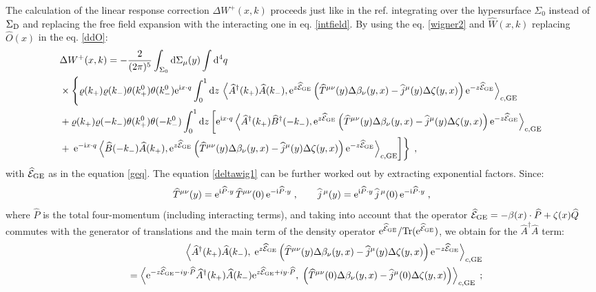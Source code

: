\documentclass[prd,superscriptaddress,nofootinbib,notitlepage]{revtex4-1}
\def\wT{{\widehat T}}
\def\wj{{\widehat j}}
\def\wP{{\widehat P}}
\def\wA{{\widehat A}}
\def\wB{{\widehat B}}
\def\wQ{{\widehat Q}}
\def\wE{{\widehat{\cal E}}}
\def\wA{\widehat A}
\def\wAd{\widehat A^{\dagger}}
\def\wB{\widehat B}
\def\wBd{\widehat B^{\dagger}}
\def\wW{\widehat W}
\def\wO{\widehat O}
\def\wQ{\widehat Q}
\newcommand{\Tr}{{\rm Tr}}
\newcommand{\e}{{\rm e}}
\newcommand{\di}{{\rm d}}
\newcommand{\ii}{{\rm i}}
\begin{document}
The calculation of the linear response correction $\Delta W^+(x,k)$ proceeds just like in the ref. \cite{Sheng:2025cjk} 
integrating over the hypersurface $\Sigma_0$ instead of $\Sigma_{\rm D}$ and replacing the free field expansion with
the interacting one in eq. \eqref{intfield}. By using the eq. \eqref{wigner2} and $\wW(x,k)$ replacing $\wO(x)$ in the
eq. \eqref{ddO}:
%
\begin{align}\label{deltawig1}
 &\Delta W^+(x,k) = - \frac{2}{(2\pi)^5} \int_{\Sigma_{0}} \di \Sigma_{\mu}(y)  
  \int \di^{4}q\;
   \nonumber\\
&\times \Bigg\{\varrho(k_+)\varrho(k_-)\theta(k_+^0)\theta(k_-^0) \e^{\ii x\cdot q}\int_0^1 \di z \, \left\langle 
\wAd (k_+) \wA (k_-), \e^{z\wE_{\rm GE}} \left(
\wT^{\mu\nu}(y) \Delta\beta_\nu(y,x) - \wj^\mu(y) \Delta\zeta(y,x) \right) \e^{-z\wE_{\rm GE}} 
   \right\rangle_{c,{\rm GE}}  \nonumber\\
& + \varrho(k_+)\varrho(-k_-) \theta(k^0_+)\theta(-k^0_-)  \int_0^1 \di z  \left[ \e^{\ii x\cdot q} 
\left\langle \wAd(k_+)\wBd(-k_-),
\e^{z\wE_{\rm GE}} \left(\wT^{\mu\nu}(y) \Delta\beta_\nu(y,x) - \wj^\mu(y) \Delta\zeta(y,x) \right) 
\e^{-z\wE_{\rm GE}} \right\rangle_{c,{\rm GE}} \right. \nonumber \\
& + \left. \left. \e^{-\ii x\cdot q} \left\langle \wB(-k_-)\wA(k_+), \e^{z\wE_{\rm GE}} \left(\wT^{\mu\nu}(y) 
\Delta\beta_\nu(y,x) - \wj^\mu(y) \Delta\zeta(y,x) \right) \e^{-z\wE_{\rm GE}} \right\rangle_{c,{\rm GE}} \right] 
\right\}\;,
\end{align}
%
with $\wE_{\rm GE}$ as in the equation \eqref{geq}. The equation \eqref{deltawig1} can be further worked out by
extracting exponential factors. Since:
%
\begin{equation}\label{transtranf}
    \wT^{\mu\nu}(y)=\e^{\ii\wP\cdot y}\,\wT^{\mu\nu}(0)\,\e^{-\ii\wP\cdot y}\;,
    \qquad \wj^{\,\mu}(y)=\e^{\ii\wP\cdot y}\,\wj^{\,\mu}(0)\,\e^{-\ii\wP\cdot y}\;,
\end{equation}
%
where $\wP$ is the total four-momentum (including interacting terms), and taking into account that the operator 
$\wE_{\rm GE}=-\beta(x)\cdot\wP+\zeta(x)\wQ$ commutes with the generator of translations and the main term of the density 
operator $\e^{\wE_{\rm GE}}/\Tr(\e^{\wE_{\rm GE}})$, we obtain for the $\wAd\wA$ term:
%
\begin{eqnarray*}
&& \left\langle \wAd (k_+) \wA (k_-),\; \e^{z\wE_{\rm GE}} \left(
   \wT^{\mu\nu}(y) \Delta\beta_\nu(y,x) - \wj^\mu(y) \Delta\zeta(y,x) \right) \e^{-z\wE_{\rm GE}} 
   \right\rangle_{c,{\rm GE}} \\
&& =\left\langle 
\e^{-z\wE_{\rm GE}-iy\cdot\wP}
\wAd (k_+) \wA (k_-)\e^{z\wE_{\rm GE}+iy\cdot\wP} ,\;
   \left( \wT^{\mu\nu}(0) \Delta\beta_\nu(y,x) - \wj^\mu(0) \Delta\zeta(y,x) \right) \right\rangle_{c,{\rm GE}}\;;
\end{eqnarray*}
\end{document}
